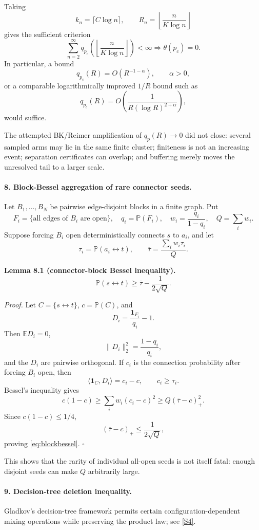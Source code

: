 \documentclass[11pt]{article}
\newcommand{\one}{\mathbf 1}
\begin{document}
Taking
\[
k_n=\lceil C\log n\rceil,
\qquad
R_n=\left\lfloor\frac{n}{K\log n}\right\rfloor
\]
gives the sufficient criterion
\[
\boxed{
\sum_{n=2}^\infty
q_{p_c}\left(\left\lfloor\frac{n}{K\log n}\right\rfloor\right)<\infty
\Longrightarrow
\theta(p_c)=0.
}
\tag{7.3}\label{eq:summableq}
\]
In particular, a bound
\[
q_{p_c}(R)=O(R^{-1-\alpha}),\qquad \alpha>0,
\tag{7.4}
\]
or a comparable logarithmically improved \(1/R\) bound such as
\[
q_{p_c}(R)
=
O\left(\frac1{R(\log R)^{2+\alpha}}\right),
\tag{7.5}
\]
would suffice.

The attempted BK/Reimer amplification of \(q_p(R)\to0\) did not close: several sampled arms may lie in the same finite cluster; finiteness is not an increasing event; separation certificates can overlap; and buffering merely moves the unresolved tail to a larger scale.

\paragraph{8. Block-Bessel aggregation of rare connector seeds.}
Let \(B_1,\ldots,B_N\) be pairwise edge-disjoint blocks in a finite graph. Put
\[
F_i=\{\text{all edges of }B_i\text{ are open}\},
\quad
q_i=\mathbb P(F_i),
\quad
w_i=\frac{q_i}{1-q_i},
\quad
Q=\sum_iw_i.
\]
Suppose forcing \(B_i\) open deterministically connects \(s\) to \(a_i\), and let
\[
\tau_i=\mathbb P(a_i\leftrightarrow t),
\qquad
\overline\tau=\frac{\sum_iw_i\tau_i}{Q}.
\]

\textbf{Lemma 8.1 (connector-block Bessel inequality).}
\[
\boxed{
\mathbb P(s\leftrightarrow t)
\ge
\overline\tau-\frac1{2\sqrt Q}.
}
\tag{8.1}\label{eq:blockbessel}
\]

\emph{Proof.}
Let \(C=\{s\leftrightarrow t\}\), \(c=\mathbb P(C)\), and
\[
D_i=\frac{\one_{F_i}}{q_i}-1.
\]
Then \(\mathbb ED_i=0\),
\[
\|D_i\|_2^2=\frac{1-q_i}{q_i},
\]
and the \(D_i\) are pairwise orthogonal. If \(c_i\) is the connection probability after forcing \(B_i\) open, then
\[
\langle\one_C,D_i\rangle=c_i-c,
\qquad
c_i\ge\tau_i.
\]
Bessel's inequality gives
\[
c(1-c)\ge\sum_iw_i(c_i-c)^2
\ge Q(\overline\tau-c)_+^2.
\]
Since \(c(1-c)\le1/4\),
\[
(\overline\tau-c)_+\le\frac1{2\sqrt Q},
\]
proving \eqref{eq:blockbessel}. \hfill\(\square\)

This shows that the rarity of individual all-open seeds is not itself fatal: enough disjoint seeds can make \(Q\) arbitrarily large.

\paragraph{9. Decision-tree deletion inequality.}
Gladkov's decision-tree framework permits certain configuration-dependent mixing operations while preserving the product law; see \href{https://arxiv.org/html/2408.08457v2}{[S4]}.
\end{document}
